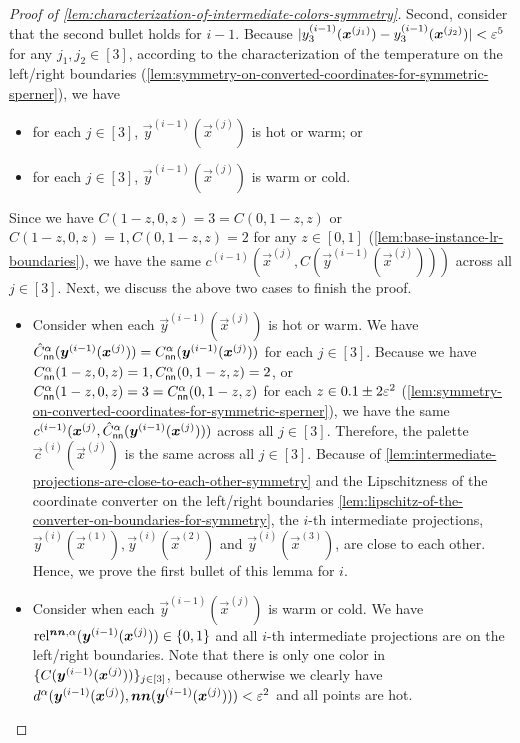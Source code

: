\begin{proof}[Proof of \cref{lem:characterization-of-intermediate-colors-symmetry}]
    Second, consider that the second bullet holds for $i-1$. 
    Because $|y_3^{(i-1)}(\vec{x}^{(j_1)})-y_3^{(i-1)}(\vec{x}^{(j_2)})|<\eps^{5}$ for any $j_1,j_2\in [3]$, according to the characterization of the temperature on the left/right boundaries (\cref{lem:symmetry-on-converted-coordinates-for-symmetric-sperner}), we have 
    \begin{itemize}[itemsep=0.2em,topsep=0.5em]
        \item for each $j\in [3]$, $\vec{y}^{(i-1)}(\vec{x}^{(j)})$ is hot or warm; or 
        \item for each $j\in [3]$, $\vec{y}^{(i-1)}(\vec{x}^{(j)})$ is warm or cold. 
    \end{itemize}
    Since we have $C(1-z,0,z)=3=C(0,1-z,z)$ or $C(1-z,0,z)=1, C(0,1-z,z)=2$ for any $z\in [0,1]$ (\cref{lem:base-instance-lr-boundaries}), we have the same $c^{(i-1)}(\vec{x}^{(j)},C(\vec{y}^{(i-1)}(\vec{x}^{(j)})))$ across all $j\in [3]$.
    Next, we discuss the above two cases to finish the proof. 
    \begin{itemize}[itemsep=0.2em,topsep=0.5em]
        \item Consider when each $\vec{y}^{(i-1)}(\vec{x}^{(j)})$ is hot or warm. We have $\hat{C}^\alpha_{\sf nn}(\vec{y}^{(i-1)}(\vec{x}^{(j)}))=C^\alpha_{\sf nn}(\vec{y}^{(i-1)}(\vec{x}^{(j)}))$ for each $j\in [3]$. Because we have $C^\alpha_{\sf nn}(1-z,0,z)=1, C^\alpha_{\sf nn}(0,1-z,z)=2$, or $C^\alpha_{\sf nn}(1-z,0,z)=3=C^\alpha_{\sf nn}(0,1-z,z)$ for each $z\in 0.1\pm 2\eps^2$ (\cref{lem:symmetry-on-converted-coordinates-for-symmetric-sperner}), we have the same $c^{(i-1)}(\vec{x}^{(j)},\hat{C}^\alpha_{\sf nn}(\vec{y}^{(i-1)}(\vec{x}^{(j)})))$ across all $j\in [3]$.
        Therefore, the palette $\vec{c}^{(i)}(\vec{x}^{(j)})$ is the same across all $j\in [3]$. 
        Because of \cref{lem:intermediate-projections-are-close-to-each-other-symmetry} and the Lipschitzness of the coordinate converter on the left/right boundaries \cref{lem:lipschitz-of-the-converter-on-boundaries-for-symmetry}, the $i$-th intermediate projections, $\vec{y}^{(i)}(\vec{x}^{(1)}), \vec{y}^{(i)}(\vec{x}^{(2)})$ and $\vec{y}^{(i)}(\vec{x}^{(3)})$, are close to each other. 
        Hence, we prove the first bullet of this lemma for $i$. 
        \item Consider when each $\vec{y}^{(i-1)}(\vec{x}^{(j)})$ is warm or cold. We have $\rela(\vec{y}^{(i-1)}(\vec{x}^{(j)}))\in \{0,1\}$ and all $i$-th intermediate projections are on the left/right boundaries. 
        Note that there is only one color in $\settxt{C(\vec{y}^{(i-1)}(\vec{x}^{(j)}))}_{j\in [3]}$, because otherwise we clearly have $d^\alpha(\vec{y}^{(i-1)}(\vec{x}^{(j)}),\nn(\vec{y}^{(i-1)}(\vec{x}^{(j)})))<\eps^2$ and all points are hot. 

\end{itemize}
\end{proof}

